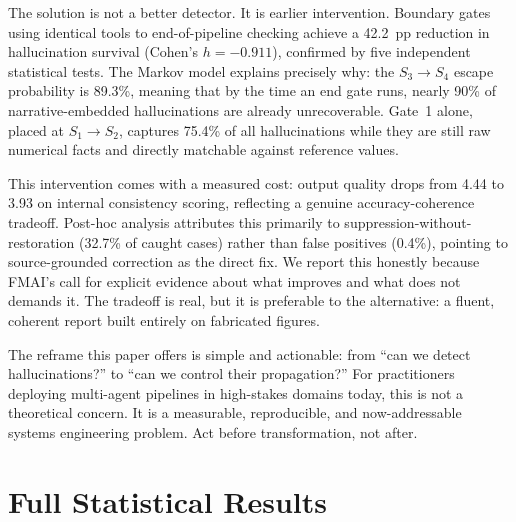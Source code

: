\documentclass{article}
\theoremstyle{plain}
\theoremstyle{definition}
\theoremstyle{remark}
\begin{document}
The solution is not a better detector. It is earlier intervention. Boundary gates using identical tools to end-of-pipeline checking achieve a 42.2~pp reduction in hallucination survival (Cohen's $h = -0.911$), confirmed by five independent statistical tests. The Markov model explains precisely why: the $S_3{\to}S_4$ escape probability is 89.3\%, meaning that by the time an end gate runs, nearly 90\% of narrative-embedded hallucinations are already unrecoverable. Gate~1 alone, placed at $S_1{\to}S_2$, captures 75.4\% of all hallucinations while they are still raw numerical facts and directly matchable against reference values.

This intervention comes with a measured cost: output quality drops from 4.44 to 3.93 on internal consistency scoring, reflecting a genuine accuracy-coherence tradeoff. Post-hoc analysis attributes this primarily to suppression-without-restoration (32.7\% of caught cases) rather than false positives (0.4\%), pointing to source-grounded correction as the direct fix. We report this honestly because FMAI's call for explicit evidence about what improves and what does not demands it. The tradeoff is real, but it is preferable to the alternative: a fluent, coherent report built entirely on fabricated figures.

The reframe this paper offers is simple and actionable: from ``can we detect hallucinations?'' to ``can we control their propagation?'' For practitioners deploying multi-agent pipelines in high-stakes domains today, this is not a theoretical concern. It is a measurable, reproducible, and now-addressable systems engineering problem. Act before transformation, not after.

\newpage





\clearpage
\appendix

\section{Full Statistical Results}
\label{app:stats}
\end{document}
